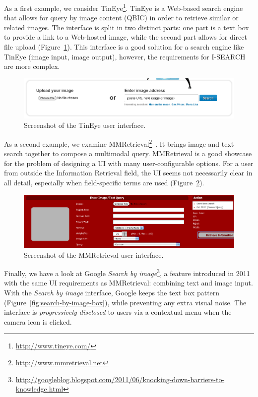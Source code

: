 \documentclass[runningheads,a4paper]{llncs} \usepackage[utf8]{inputenc}
\begin{document}
As a first example, we consider TinEye\footnote{\url{http://www.tineye.com/}}. TinEye is a Web-based search engine that allows for query by image content (QBIC) in order to retrieve similar or related images. The interface is split in two distinct parts: one part is a text box to provide a link to a Web-hosted image, while the second part allows for direct file upload (Figure~\ref{fig:tineye-ui}). This interface is a good solution for a search engine like TinEye (image input, image output), however, the requirements for \mbox{I-SEARCH} are more complex.

\begin{figure}[h!]
  \centering
    \includegraphics[width=0.7\linewidth]{resources/tineye-UI.png}
  \caption{Screenshot of the TinEye user interface.}
  \label{fig:tineye-ui}
\end{figure}

As a second example, we examine MMRetrieval\footnote{\url{http://www.mmretrieval.net}}~\cite{mmretrieval}. It brings image and text search together to compose a multimodal query. MMRetrieval is a good showcase for the problem of designing a UI with many user-configurable options. For a user from outside the Information Retrieval field, the UI seems not necessarily clear in all detail, especially when field-specific terms are used (Figure~\ref{fig:mmretrieval-ui}).

\begin{figure}[h!]
  \centering
    \includegraphics[width=0.7\linewidth]{resources/mmretrieval-UI.png}
  \caption{Screenshot of the MMRetrieval user interface.}
  \label{fig:mmretrieval-ui}
\end{figure}

Finally, we have a look at Google \textit{Search by image}\footnote{\url{http://googleblog.blogspot.com/2011/06/knocking-down-barriers-to-knowledge.html}}, a feature introduced in 2011 with the same UI requirements as MMRetrieval: combining text and image input. With the \textit{Search by image} interface, Google keeps the text box pattern (Figure~\ref{fig:search-by-image-box}), while preventing any extra visual noise. The interface is \emph{progressively disclosed} to users via a contextual menu when the camera icon is clicked.
\end{document}
